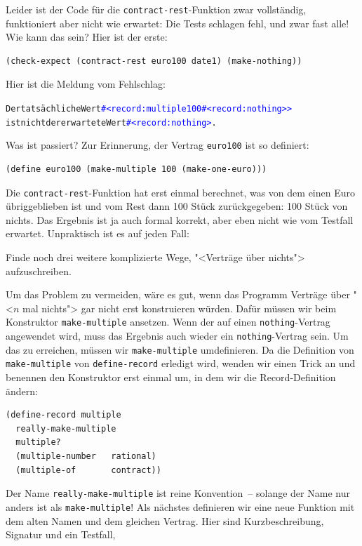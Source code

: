 Leider ist der Code für die \lstinline{contract-rest}-Funktion zwar
vollständig, funktioniert aber nicht wie erwartet: Die Tests schlagen
fehl, und zwar fast alle!  Wie kann das sein?  Hier ist
der erste:
%
\begin{lstlisting}
(check-expect (contract-rest euro100 date1) (make-nothing))
\end{lstlisting}
%
Hier ist die Meldung vom Fehlschlag:
%
\begin{alltt}
Der tatsächliche Wert \textcolor{blue}{#<record:multiple 100 #<record:nothing>>}
ist nicht der erwartete Wert \textcolor{blue}{#<record:nothing>}.
\end{alltt}
%
Was ist passiert?  Zur Erinnerung, der Vertrag \lstinline{euro100} ist
so definiert:
%
\begin{lstlisting}
(define euro100 (make-multiple 100 (make-one-euro))) 
\end{lstlisting}
%
Die \lstinline{contract-rest}-Funktion hat erst einmal berechnet, was
von dem einen Euro übriggeblieben ist und vom Rest dann 100 Stück
zurückgegeben: 100 Stück von nichts.  Das Ergebnis ist ja auch
formal korrekt, aber eben nicht wie vom Testfall erwartet.
Unpraktisch ist es auf jeden Fall:
%
\begin{aufgabeinline}
  Finde noch drei weitere komplizierte Wege, "<Verträge über nichts">
  aufzuschreiben.
\end{aufgabeinline}
%
Um das Problem zu vermeiden, wäre es gut, wenn das Programm Verträge
über "<$n$ mal nichts"> gar nicht erst konstruieren würden.  Dafür
müssen wir beim Konstruktor \lstinline{make-multiple} ansetzen.  Wenn
der auf einen \lstinline{nothing}-Vertrag angewendet wird, muss das
Ergebnis auch wieder ein \lstinline{nothing}-Vertrag sein.  Um das zu
erreichen, müssen wir \lstinline{make-multiple} umdefinieren.  Da die
Definition von \lstinline{make-multiple} von
\lstinline{define-record} erledigt wird, wenden wir einen
Trick an und benennen den Konstruktor erst einmal um, in dem wir die
Record-Definition ändern:
%
\begin{lstlisting}
(define-record multiple
  really-make-multiple
  multiple?
  (multiple-number   rational)
  (multiple-of       contract))
\end{lstlisting}
%
Der Name \lstinline{really-make-multiple} ist reine Konvention~--
solange der Name nur anders ist als \lstinline{make-multiple}!  Als
nächstes definieren wir eine neue Funktion mit dem alten Namen und dem
gleichen Vertrag.  Hier sind Kurzbeschreibung, Signatur und ein Testfall,
